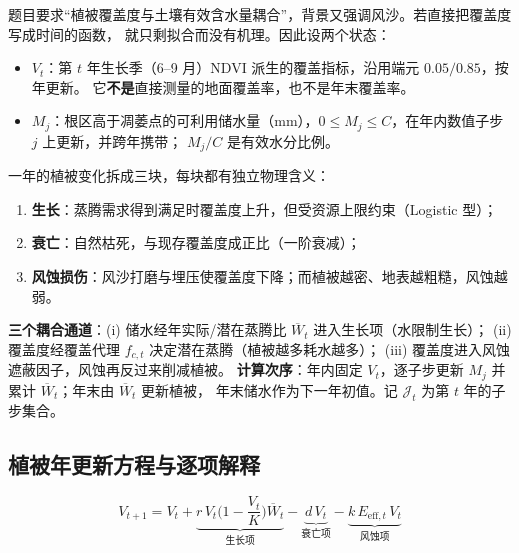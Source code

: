 \documentclass[11pt,a4paper]{ctexart}
\begin{document}
题目要求“植被覆盖度与土壤有效含水量耦合”，背景又强调风沙。若直接把覆盖度写成时间的函数，
就只剩拟合而没有机理。因此设两个状态：
\begin{itemize}
\item $V_t$：第 $t$ 年生长季（6--9 月）NDVI 派生的覆盖指标，沿用端元 $0.05/0.85$，按年更新。
它\textbf{不是}直接测量的地面覆盖率，也不是年末覆盖率。
\item $M_j$：根区高于凋萎点的可利用储水量（mm），$0\le M_j\le C$，在年内数值子步 $j$ 上更新，并跨年携带；
$M_j/C$ 是有效水分比例。
\end{itemize}
一年的植被变化拆成三块，每块都有独立物理含义：
\begin{enumerate}
\item \textbf{生长}：蒸腾需求得到满足时覆盖度上升，但受资源上限约束（Logistic 型）；
\item \textbf{衰亡}：自然枯死，与现存覆盖度成正比（一阶衰减）；
\item \textbf{风蚀损伤}：风沙打磨与埋压使覆盖度下降；而植被越密、地表越粗糙，风蚀越弱。
\end{enumerate}

\textbf{三个耦合通道}：(i) 储水经年实际/潜在蒸腾比 $\overline W_t$ 进入生长项（水限制生长）；
(ii) 覆盖度经覆盖代理 $f_{c,t}$ 决定潜在蒸腾（植被越多耗水越多）；
(iii) 覆盖度进入风蚀遮蔽因子，风蚀再反过来削减植被。
\textbf{计算次序}：年内固定 $V_t$，逐子步更新 $M_j$ 并累计 $\overline W_t$；年末由 $\overline W_t$ 更新植被，
年末储水作为下一年初值。记 $\mathcal J_t$ 为第 $t$ 年的子步集合。

\subsection{植被年更新方程与逐项解释}

\begin{equation}\label{eq:t1}
\boxed{\;
V_{t+1}=V_t
+\underbrace{r\,V_t\Big(1-\frac{V_t}{K}\Big)\overline W_t}_{\text{生长项}}
-\underbrace{d\,V_t}_{\text{衰亡项}}
-\underbrace{k\,E_{\mathrm{eff},t}\,V_t}_{\text{风蚀项}}
\;}
\end{equation}
\end{document}
